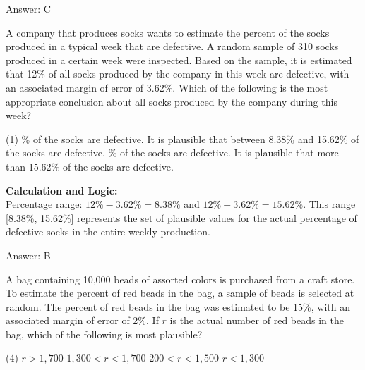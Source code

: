 \documentclass[11pt,paper=a4,answers]{exam}
\begin{document}
\begin{questions}
\begin{solution}
\vspace{30pt}

Answer: \colorbox{yellow!100}{C}
\end{solution}

\vspace{60pt}

\question
A company that produces socks wants to estimate the percent of the socks produced in a typical week that are defective. A random sample of 310 socks produced in a certain week were inspected. Based on the sample, it is estimated that 12\% of all socks produced by the company in this week are defective, with an associated margin of error of 3.62\%. Which of the following is the most appropriate conclusion about all socks produced by the company during this week?
\begin{tasks}(1)
    \% of the socks are defective.
    \task It is plausible that between 8.38\% and 15.62\% of the socks are defective.
    \% of the socks are defective.
    \task It is plausible that more than 15.62\% of the socks are defective.
\end{tasks}

\begin{solution}
\textbf{Calculation and Logic:} \\
Percentage range: $12\% - 3.62\% = 8.38\%$ and $12\% + 3.62\% = 15.62\%$. This range [8.38\%, 15.62\%] represents the set of plausible values for the actual percentage of defective socks in the entire weekly production.

\vspace{30pt}

Answer: \colorbox{yellow!100}{B}
\end{solution}

\vspace{60pt}

\question
A bag containing 10,000 beads of assorted colors is purchased from a craft store. To estimate the percent of red beads in the bag, a sample of beads is selected at random. The percent of red beads in the bag was estimated to be 15\%, with an associated margin of error of 2\%. If $r$ is the actual number of red beads in the bag, which of the following is most plausible?
\begin{tasks}(4)
    \task $r > 1,700$
    \task $1,300 < r < 1,700$
    \task $200 < r < 1,500$
    \task $r < 1,300$
\end{tasks}


\end{questions}
\end{document}
